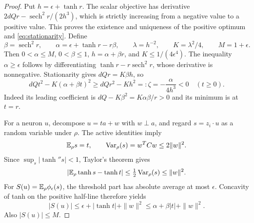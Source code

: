 \begin{proof}
Put $h=\epsilon+\tanh r$. The scalar objective has derivative
$2dQr-\operatorname{sech}^2r/(2h^3)$, which is strictly increasing
from a negative value to a positive value. This proves the existence
and uniqueness of the positive optimum and \eqref{eq:stationarity}.
Define
\[
 \beta=\operatorname{sech}^2r,\qquad
 \alpha=\epsilon+\tanh r-r\beta,\qquad
 \lambda=h^{-2},\qquad K=\lambda^2/4,\qquad M=1+\epsilon.
\]
Then $0<\alpha\le M$, $0<\beta\le1$,
$h=\alpha+\beta r$, and $K\le1/(4\epsilon^4)$.
The inequality $\alpha\ge\epsilon$ follows by differentiating
$\tanh r-r\operatorname{sech}^2r$, whose derivative is nonnegative.
Stationarity gives $dQr=K\beta h$, so
\begin{equation}\label{eq:quadratic-floor}
 dQ t^2-K(\alpha+\beta t)^2\ge
 dQr^2-Kh^2=:\zeta=-\frac{\alpha}{4h^3}<0
 \quad(t\ge0).
\end{equation}
Indeed its leading coefficient is
$dQ-K\beta^2=K\alpha\beta/r>0$ and its minimum is at $t=r$.

For a neuron $u$, decompose $u=ta+w$ with $w\perp a$, and regard
$s=z_i\cdot u$ as a random variable under $\rho$.
The active identities imply
\[
 \mathbb E_\rho s=t,\qquad
 \operatorname{Var}_\rho(s)=w^TCw\le2\|w\|^2.
\]
Since $\sup_s|\tanh''s|<1$, Taylor's theorem gives
\[
 |\mathbb E_\rho\tanh s-\tanh t|
 \le\tfrac12\operatorname{Var}_\rho(s)\le\|w\|^2.
\]
For $S(u)=\mathbb E_\rho\phi_\epsilon(s)$, the threshold part has
absolute average at most $\epsilon$. Concavity of tanh on the
positive half-line therefore yields
\begin{equation}\label{eq:atom-average}
 |S(u)|\le\epsilon+|\tanh t|+\|w\|^2
       \le\alpha+\beta|t|+\|w\|^2.
\end{equation}
Also $|S(u)|\le M$.


\end{proof}
